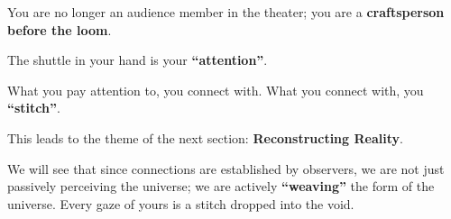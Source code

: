 You are no longer an audience member in the theater; you are a \textbf{craftsperson before the loom}.

The shuttle in your hand is your \textbf{``attention''}.

What you pay attention to, you connect with. What you connect with, you \textbf{``stitch''}.

This leads to the theme of the next section: \textbf{Reconstructing Reality}.

We will see that since connections are established by observers, we are not just passively perceiving the universe; we are actively \textbf{``weaving''} the form of the universe. Every gaze of yours is a stitch dropped into the void.

